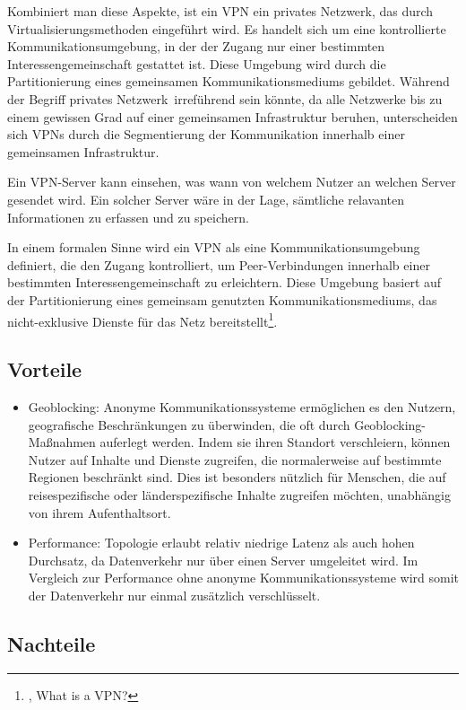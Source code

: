 Kombiniert man diese Aspekte, ist ein VPN ein privates Netzwerk, das durch Virtualisierungsmethoden eingeführt wird. Es handelt sich um eine kontrollierte Kommunikationsumgebung, in der der Zugang nur einer bestimmten Interessengemeinschaft gestattet ist. Diese Umgebung wird durch die Partitionierung eines gemeinsamen Kommunikationsmediums gebildet. Während der Begriff \glqq privates Netzwerk\grqq\ irreführend sein könnte, da alle Netzwerke bis zu einem gewissen Grad auf einer gemeinsamen Infrastruktur beruhen, unterscheiden sich VPNs durch die Segmentierung der Kommunikation innerhalb einer gemeinsamen Infrastruktur.

Ein VPN-Server kann einsehen, was wann von welchem Nutzer an welchen Server gesendet wird. Ein solcher Server wäre in der Lage, sämtliche relavanten Informationen zu erfassen und zu speichern.

In einem formalen Sinne wird ein VPN als eine Kommunikationsumgebung definiert, die den Zugang kontrolliert, um Peer-Verbindungen innerhalb einer bestimmten Interessengemeinschaft zu erleichtern. Diese Umgebung basiert auf der Partitionierung eines gemeinsam genutzten Kommunikationsmediums, das nicht-exklusive Dienste für das Netz bereitstellt\footnote{\cite{DefinitionOfVPN}, What is a VPN?}.

\subsection{Vorteile}

\begin{itemize}
    \item Geoblocking: Anonyme Kommunikationssysteme ermöglichen es den Nutzern, geografische Beschränkungen zu überwinden, die oft durch Geoblocking-Maßnahmen auferlegt werden. Indem sie ihren Standort verschleiern, können Nutzer auf Inhalte und Dienste zugreifen, die normalerweise auf bestimmte Regionen beschränkt sind. Dies ist besonders nützlich für Menschen, die auf reisespezifische oder länderspezifische Inhalte zugreifen möchten, unabhängig von ihrem Aufenthaltsort.
    \item Performance: Topologie erlaubt relativ niedrige Latenz als auch hohen Durchsatz, da Datenverkehr nur über einen Server umgeleitet wird. Im Vergleich zur Performance ohne anonyme Kommunikationssysteme wird somit der Datenverkehr nur einmal zusätzlich verschlüsselt.
\end{itemize}

\subsection{Nachteile}


